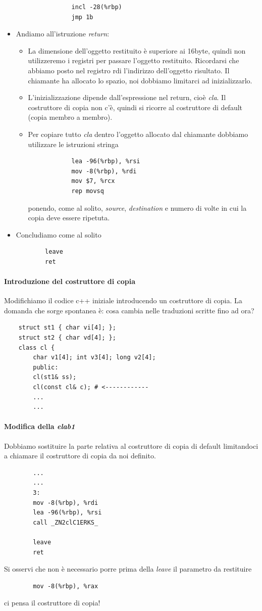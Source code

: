 \begin{itemize}
\begin{itemize}
		\begin{verbatim}
			incl -28(%rbp)
			jmp 1b
		\end{verbatim}
	\end{itemize}
	\item Andiamo all'istruzione \emph{return}:
	\begin{itemize}
		\item La dimensione dell'oggetto restituito è superiore ai 16byte, quindi non utilizzeremo i registri per passare l'oggetto restituito. Ricordarsi che abbiamo posto nel registro rdi l'indirizzo dell'oggetto risultato. Il chiamante ha allocato lo spazio, noi dobbiamo limitarci ad inizializzarlo.
		\item L'inizializzazione dipende dall'espressione nel return, cioè \emph{cla}. Il costruttore di copia non c'è, quindi si ricorre al costruttore di default (copia membro a membro).
		\item Per copiare tutto \emph{cla} dentro l'oggetto allocato dal chiamante dobbiamo utilizzare le istruzioni stringa
		\begin{verbatim}
			lea -96(%rbp), %rsi
			mov -8(%rbp), %rdi
			mov $7, %rcx
			rep movsq
		\end{verbatim}
		ponendo, come al solito, \emph{source}, \emph{destination} e numero di volte in cui la copia deve essere ripetuta.
	\end{itemize}
	\item Concludiamo come al solito
	\begin{verbatim}
		leave
		ret
	\end{verbatim}
\end{itemize}
\paragraph{Introduzione del costruttore di copia}
Modifichiamo il codice c++ iniziale introducendo un costruttore di copia. La domanda che sorge spontanea è: cosa cambia nelle traduzioni scritte fino ad ora? 
\begin{verbatim}
	struct st1 { char vi[4]; };
	struct st2 { char vd[4]; };
	class cl {
		char v1[4]; int v3[4]; long v2[4];
		public:
		cl(st1& ss);
		cl(const cl& c); # <------------
		...
		...
	\end{verbatim}
	\paragraph{Modifica della \emph{elab1}} Dobbiamo sostituire la parte relativa al costruttore di copia di default limitandoci a chiamare il costruttore di copia da noi definito.
	\begin{verbatim}
		...
		...
		3:
		mov -8(%rbp), %rdi
		lea -96(%rbp), %rsi
		call _ZN2clC1ERKS_
		
		leave
		ret
	\end{verbatim}
	Si osservi che non è necessario porre prima della \emph{leave} il parametro da restituire
	\begin{verbatim}
		mov -8(%rbp), %rax
	\end{verbatim}
	ci pensa il costruttore di copia!

